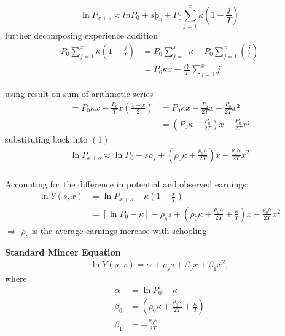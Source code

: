 \begin{frame}
\begin{equation}
\ln P_{x+s}  \approx ln P_0 + sþ_s + P_0 \sum_{j=1}^{x} \kappa \left(1-\frac{j}{T}\right)
\end{equation}
further decomposing experience addition
\begin{align*}
P_0 \sum_{j=1}^{x} \kappa \left(1-\frac{j}{T}\right) & = P_0 \sum_{j=1}^{x} \kappa - P_0 \sum_{j=1}^{x} \left(\frac{j}{T}\right) \\
 &  = P_0 \kappa x - \frac{P_0}{T} \sum_{j=1}^{x} j
\end{align*}
\end{frame}
\begin{frame}
using result on sum of arithmetic series
\begin{align*}
= P_0 \kappa x - \frac{P_0}{T} x \left(\frac{1+x}{2} \right) & = P_0 \kappa x - \frac{P_0}{2T}x - \frac{P_0}{2T} x² \\
 & = \left(P_0 \kappa - \frac{P_0}{2T}\right) x - \frac{P_0}{2T} x²
 \end{align*}
 substituting back into $(1)$
 \begin{align*}
 \ln P_{x + s}  \approx \ln P_0 + s\rho_s + \left(\rho_0 \kappa + \frac{\rho_0\kappa}{2T}\right)x - \frac{\rho_0\kappa}{2T} x^2 \\
 \end{align*}


\end{frame}
\begin{frame}
Accounting for the difference in potential and observed earnings:
\begin{align*}
\ln Y(s, x) & = \ln P_{x + s} - \kappa\left(1 - \frac{x}{T}\right) \\
            & = [\ln P_0 - \kappa] + \rho_s s + \left(\rho_0\kappa + \frac{\rho_0\kappa}{2T} + \frac{\kappa}{T}\right) x - \frac{\rho_0\kappa}{2T}x^2
\end{align*}
$\Rightarrow$ $\rho_s$ is the average earnings increase with schooling
\end{frame}

\begin{frame}
\textbf{Standard Mincer Equation}
\begin{align*}
\ln Y(s, x) = \alpha + \rho_s s + \beta_0 x + \beta_1 x^2,
\end{align*}
where
\begin{align*}
\alpha & =\ln P_0 - \kappa \\
\beta_0 & = \left(\rho_0\kappa + \frac{\rho_0\kappa}{2T} + \frac{\kappa}{T}\right) \\
\beta_1 & = -\frac{\rho_0\kappa}{2T}
\end{align*}
\end{frame}

